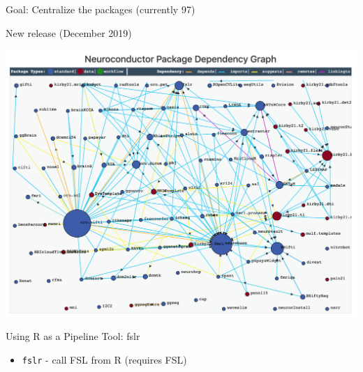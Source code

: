 \documentclass[ignorenonframetext,]{beamer}
\providecommand{\tightlist}{%
  \setlength{\itemsep}{0pt}\setlength{\parskip}{0pt}}
\begin{document}
\begin{frame}{Goal: Centralize the packages (currently 97)}
\protect\hypertarget{goal-centralize-the-packages-currently-97}{}

\end{frame}

\begin{frame}{New release (December 2019)}
\protect\hypertarget{new-release-december-2019}{}

\begin{center}\includegraphics[width=0.7\linewidth]{figures/dependency_graph} \end{center}

\end{frame}

\begin{frame}[fragile]{Using R as a Pipeline Tool: fslr }
\protect\hypertarget{using-r-as-a-pipeline-tool-fslr}{}

\begin{itemize}
\tightlist
\item
  \texttt{fslr} - call FSL from R (requires FSL)
\end{itemize}

\end{frame}
\end{document}
